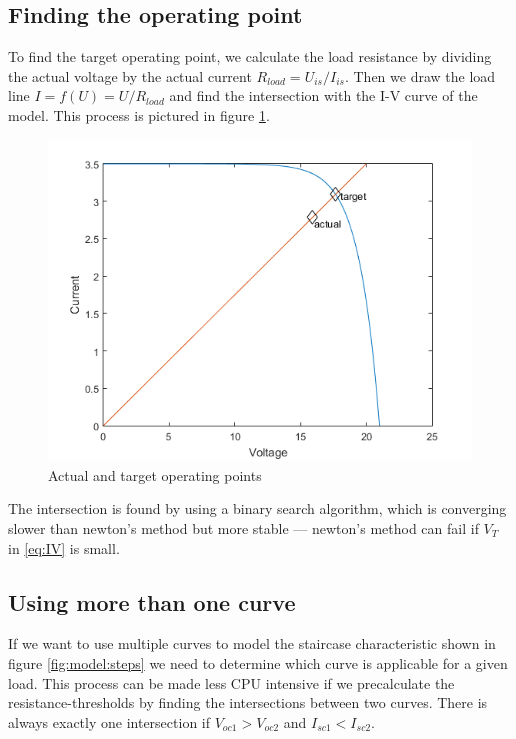 \subsection{Finding the operating point}
To find the target operating point, we calculate the load resistance by dividing the actual voltage by the actual current $R_{load} = U_{is} / I_{is}$. Then we draw the load line $I = f(U) = U / R_{load}$ and find the intersection with the I-V curve of the model. This process is pictured in figure \ref{fig:model:approx}. 
\begin{figure}[h]
	\center
    \includegraphics[width=.75\textwidth]{images/model/approx.png}
    \caption{Actual and target operating points}
    \label{fig:model:approx}
\end{figure}
The intersection is found by using a binary search algorithm, which is converging slower than newton's method but more stable --- newton's method can fail if $V_T$ in \eqref{eq:IV} is small.  

\subsection{Using more than one curve}
If we want to use multiple curves to model the staircase characteristic shown in figure \ref{fig:model:steps} we need to determine which curve is applicable for a given load. This process can be made less CPU intensive if we precalculate the resistance-thresholds by finding the intersections between two curves. There is always exactly one intersection if $V_{oc1} > V_{oc2}$ and $I_{sc1} < I_{sc2}$. 